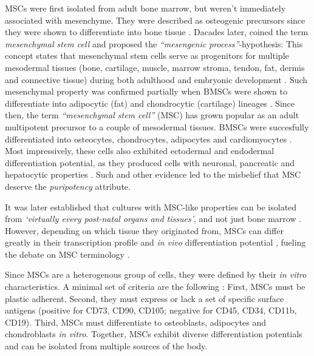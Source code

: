 \acp{MSC} were first isolated from adult bone marrow, but weren't immediately
associated with mesenchyme. They were described as osteogenic precursors since
they were shown to differentiate into bone tissue
\cite{friedensteinOsteogenesisTransplantsBone1966,
    friedensteinOsteogenicPrecursorCells1971, biancoMesenchymalStemCells2014}.
Dacades later, \citet{caplanMesenchymalStemCells1991} coined the term
\emph{mesenchymal stem cell} and proposed the \emph{``mesengenic
    process''}-hypothesis: This concept states that mesenchymal stem cells serve as
progenitors for multiple mesodermal tissues (bone, cartilage, muscle, marrow
stroma, tendon, fat, dermis and connective tissue) during both adulthood and
embryonic development \cite{caplanMesengenicProcess1994}. Such mesenchymal
property was confirmed partially when \acp{BMSC} were shown to differentiate
into adipocytic (fat) and chondrocytic (cartilage) lineages
\cite{pittengerMultilineagePotentialAdult1999}. Since then, the term
\emph{``mesenchymal stem cell''} (MSC) has grown popular as an adult multipotent
precursor to a couple of mesodermal tissues. \acp{BMSC} were succesfully
differentiated into osteocytes, chondrocytes, adipocytes and cardiomyocytes
\cite{gronthosSTRO1FractionAdult1994,
    muruganandanAdipocyteDifferentiationBone2009, xuMesenchymalStemCells2004}. Most
impressively, these cells also exhibited ectodermal and endodermal
differentiation potential, as they produced cells with neuronal, pancreatic and
hepatocytic properties \cite{barzilayLentiviralDeliveryLMX1a2009,
    wilkinsHumanBoneMarrowderived2009, gabrInsulinproducingCellsAdult2013,
    stockHumanBoneMarrow2014}. Such and other evidence led to the misbelief that
\ac{MSC} deserve the \emph{puripotency} attribute.

It was later established that cultures with MSC-like properties can be isolated
from \textit{`virtually every post-natal organs and tissues'}, and not just bone
marrow \cite{dasilvameirellesMesenchymalStemCells2006}. However, depending on
which tissue they originated from, \acp{MSC} can differ greatly in their
transcription profile and \textit{in vivo} differentiation potential
\cite{jansenFunctionalDifferencesMesenchymal2010,
    sacchettiNoIdenticalMesenchymal2016}, fueling the debate on MSC terminology
\cite{robeyMesenchymalStemCells2017}.

Since \acp{MSC} are a heterogenous group of cells, they were defined by their
\textit{in vitro} characteristics. A minimal set of criteria are the following
\cite{dominiciMinimalCriteriaDefining2006}: First, \acp{MSC} must be plastic
adherent. Second, they must express or lack a set of specific surface antigens
(positive for CD73, CD90, CD105; negative for CD45, CD34, CD11b, CD19). Third,
\acp{MSC} must differentiate to osteoblasts, adipocytes and chondroblasts
\textit{in vitro}. Together, \acp{MSC} exhibit diverse differentiation
potentials and can be isolated from multiple sources of the body.



